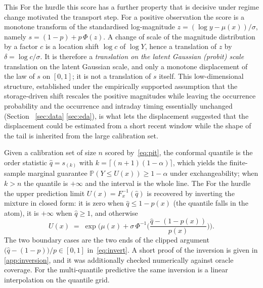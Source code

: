 \documentclass[preprint,3p,times]{elsarticle}
\providecommand{\DIFaddtex}[1]{{\protect\color{blue} \sf #1}} %
\providecommand{\DIFdeltex}[1]{{\protect\color{red} \scriptsize #1}} %
\providecommand{\DIFaddbegin}{} %
\providecommand{\DIFaddend}{} %
\providecommand{\DIFdelbegin}{} %
\providecommand{\DIFdelend}{} %
\providecommand{\DIFadd}[1]{\texorpdfstring{\DIFaddtex{#1}}{#1}} %
\providecommand{\DIFdel}[1]{\texorpdfstring{\DIFdeltex{#1}}{}} %
\begin{document}
\DIFdelbegin \DIFdel{This }\DIFdelend \DIFaddbegin \DIFadd{For the hurdle this }\DIFaddend score has a further property that \DIFdelbegin \DIFdel{is decisive under regime change}\DIFdelend \DIFaddbegin \DIFadd{motivated the transport step}\DIFaddend . For a positive observation the score is a monotone transform of the standardised log-magnitude $z=(\log y-\mu(x))/\sigma$, namely $s=(1-p)+p\,\Phi(z)$. A change of scale of the magnitude distribution by a factor $c$ is a location shift $\log c$ of $\log Y$, hence a translation of $z$ by $\delta=\log c/\sigma$. It is therefore a \DIFdelbegin \DIFdel{\emph{translation on the latent Gaussian (probit) scale}}\DIFdelend \DIFaddbegin \DIFadd{translation on the latent Gaussian scale}\DIFaddend , and only a monotone displacement of the law of $s$ on $[0,1]$; it is not a translation of $s$ itself. This low-dimensional structure, established under the empirically supported assumption that the \DIFdelbegin \DIFdel{storage-driven }\DIFdelend shift rescales the positive magnitudes while leaving \DIFdelbegin \DIFdel{the occurrence probability and the }\DIFdelend \DIFaddbegin \DIFadd{occurrence and }\DIFaddend intraday timing essentially unchanged (Section~\DIFdelbegin \DIFdel{\ref{sec:data}}\DIFdelend \DIFaddbegin \DIFadd{\ref{sec:eda}}\DIFaddend ), is what \DIFdelbegin \DIFdel{lets the displacement }\DIFdelend \DIFaddbegin \DIFadd{suggested that the displacement could }\DIFaddend be estimated from a short recent window while the shape of the tail is inherited from the large calibration set.

Given a calibration set of size $n$ scored by~\eqref{eq:pit}, the conformal quantile is the order statistic $\hat q=s_{(k)}$ with $k=\lceil (n+1)(1-\alpha)\rceil$, which yields the finite-sample marginal guarantee $\mathbb{P}(Y \le U(x)) \ge 1-\alpha$ under exchangeability; when $k>n$ the quantile is $+\infty$ and the interval is the whole line. \DIFdelbegin \DIFdel{The }\DIFdelend \DIFaddbegin \DIFadd{For the hurdle the }\DIFaddend upper prediction limit $U(x)=F_x^{-1}(\hat q)$ is recovered \DIFdelbegin \DIFdel{by inverting the mixture}\DIFdelend \DIFaddbegin \DIFadd{in closed form}\DIFaddend : it is zero when $\hat q\le 1-p(x)$\DIFdelbegin \DIFdel{(the quantile falls in the atom)}\DIFdelend , it is $+\infty$ when $\hat q\ge 1$, and otherwise
\begin{equation}
U(x) \;=\; \exp\!\Big(\mu(x) + \sigma\,\Phi^{-1}\!\big(\textstyle\frac{\hat q-(1-p(x))}{p(x)}\big)\Big).
\label{eq:invert}
\end{equation}
\DIFdelbegin \DIFdel{The two boundary cases are the two ends of the clipped argument $\big(\hat q-(1-p)\big)/p\in[0,1]$ in~\eqref{eq:invert}. }\DIFdelend A short proof of the inversion is given in \ref{app:inversion}, and it was additionally checked numerically against oracle coverage. \DIFaddbegin \DIFadd{For the multi-quantile predictive the same inversion is a linear interpolation on the quantile grid.
}\DIFaddend 
\end{document}
